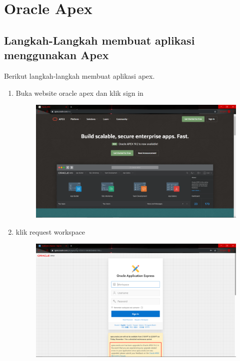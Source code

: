 \chapter*{Oracle Apex}

\section{Langkah-Langkah membuat aplikasi menggunakan Apex}

Berikut langkah-langkah membuat aplikasi apex.
\begin{enumerate}
\item Buka website oracle apex dan klik sign in
\begin{figure}[H]
        \centerline{\includegraphics[scale=0.1]{figures/1}}
        \caption{}
		\label{langkah1}
\end{figure}

\item klik request workspace
\begin{figure}[H]
        \centerline{\includegraphics[scale=0.1]{figures/2}}
        \caption{}
		\label{langkah2}
\end{figure}



\end{enumerate}
